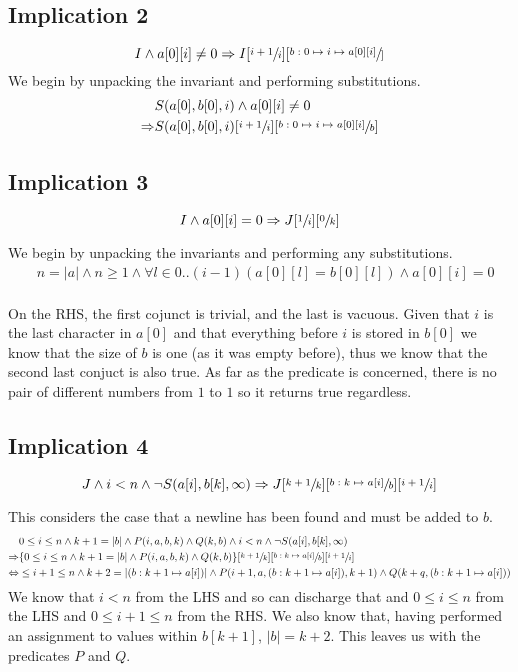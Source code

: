 \documentclass[a4paper]{article}
\begin{document}
\subsection{Implication 2}
$$ I \land a[0][i] \neq 0 \Rightarrow I[\sfrac{i+1}{i}][\sfrac{b:0 \mapsto i \mapsto a[0][i]}] $$
We begin by unpacking the invariant and performing substitutions.
\begin{align*}
		& S(a[0], b[0], i) \land a[0][i] \neq 0 \\
		\Rightarrow & { S(a[0], b[0], i) }[\sfrac{i+1}{i}][\sfrac{b: 0 \mapsto i \mapsto a[0][i]}{b}] \\
\end{align*}
	
\subsection{Implication 3}
$$ I \land a[0][i] = 0 \Rightarrow J[\sfrac{1}{i}][\sfrac{0}{k}] $$

We begin by unpacking the invariants and performing any substitutions.
\begin{align*}
		& n = |a| \land n \geq 1 \land \forall l \in 0..(i-1)(a[0][l] = b[0][l]) \land a[0][i] = 0 \\
\end{align*}

On the RHS, the first cojunct is trivial, and the last is vacuous. Given that $i$ is the last character in $a[0]$ and that everything before $i$ is stored in $b[0]$ we know that the size of $b$ is one (as it was empty before), thus we know that the second last conjuct is also true. As far as the predicate is concerned, there is no pair of different numbers from $1$ to $1$ so it returns true regardless. 

\subsection{Implication 4}
$$ J \land i < n \land \neg S(a[i],b[k],\infty) \Rightarrow J[\sfrac{k+1}{k}][\sfrac{b:k \mapsto a[i]}{b}][\sfrac{i+1}{i}] $$

This considers the case that a newline has been found and must be added to $b$.
\begin{align*}
		& 0 \leq i \leq n \land k + 1 = |b| \land P(i, a, b, k) \land Q(k, b) \land i < n \land \neg S(a[i], b[k], \infty) \\ 
		\Rightarrow & \{ 0 \leq i \leq n \land k + 1 = |b| \land P(i, a, b, k) \land Q(k, b)\}[\sfrac{k+1}{k}][\sfrac{b:k \mapsto a[i]}{b}][\sfrac{i+1}{i}] \\
		\Leftrightarrow & \leq i + 1 \leq n \land k + 2 = |(b:k+1\mapsto a[i])| \land P(i+1, a, (b:k+1\mapsto a[i]), k+1) \land Q(k+q, (b:k+1\mapsto a[i])) \\ 
\end{align*}
We know that $i < n$ from the LHS and so can discharge that and $0 \leq i \leq n$ from the LHS and $0 \leq i+1 \leq n$ from the RHS. We also know that, having performed an assignment to values within $b[k+1]$, $|b| = k+2$. This leaves us with the predicates $P$ and $Q$. 
\end{document}

